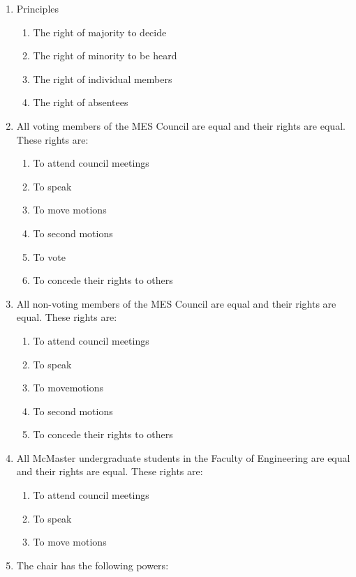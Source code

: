 \begin{enumerate}
 \item
  Principles

  \begin{enumerate}
   \item
    The right of majority to decide
   \item
    The right of minority to be heard
   \item
    The right of individual members
   \item
    The right of absentees
  \end{enumerate}
 \item
  All voting members of the MES Council are equal and their rights are
  equal. These rights are:

  \begin{enumerate}
   \item
    To attend council meetings
   \item
    To speak
   \item
    To move motions
   \item
    To second motions
   \item
    To vote
   \item
    To concede their rights to others
  \end{enumerate}
 \item
  All non-voting members of the MES Council are equal and their rights
  are equal. These rights are:

  \begin{enumerate}
   \item
    To attend council meetings
   \item
    To speak
   \item
    To movemotions %
   \item
    To second motions
   \item
    To concede their rights to others
  \end{enumerate}
 \item
  All McMaster undergraduate students in the Faculty of Engineering are
  equal and their rights are equal. These rights are:

  \begin{enumerate}
   \item
    To attend council meetings
   \item
    To speak
   \item
    To move motions
  \end{enumerate}
 \item
  The chair has the following powers:


\end{enumerate}
